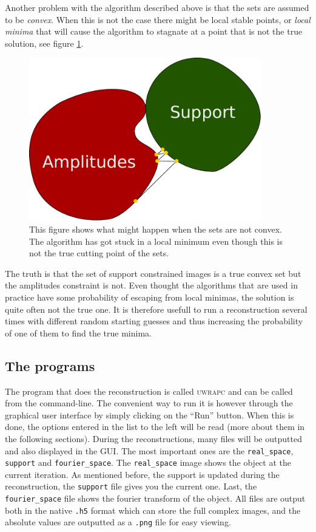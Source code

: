 \documentclass[11pt,a4paper]{article}
\newcommand{\hawk}[1]{\textsc{#1}}
\newcommand{\com}[1]{\texttt{#1}}
\begin{document}
Another problem with the algorithm described above is that the sets are assumed to be \emph{convex}. When this is not the case there might be local stable points, or \emph{local minima} that will cause the algorithm to stagnate at a point that is not the true solution, see figure \ref{fig:twosets_nonconvex}.
\begin{figure}
  \includegraphics[width=0.9\textwidth]{Images/Convex_optimization/twosets_nonconvex.pdf}
  \caption{This figure shows what might happen when the sets are not convex. The algorithm has got stuck in a local minimum even though this is not the true cutting point of the sets.}
  \label{fig:twosets_nonconvex}
\end{figure}

The truth is that the set of support constrained images is a true convex set but the amplitudes constraint is not. Even thought the algorithms that are used in practice have some probability of escaping from local minimas, the solution is quite often not the true one. It is therefore usefull to run a reconstruction several times with different random starting guesses and thus increasing the probability of one of them to find the true minima.

\subsection{The programs}
The program that does the reconstruction is called \hawk{uwrapc} and can be called from the command-line. The convenient way to run it is however through the graphical user interface by simply clicking on the ``Run'' button. When this is done, the options entered in the list to the left will be read (more about them in the following sections). During the reconstructions, many files will be outputted and also displayed in the GUI. The most important ones are the \com{real\_space}, \com{support} and \com{fourier\_space}. The \com{real\_space} image shows the object at the current iteration. As mentioned before, the support is updated during the reconstruction, the \com{support} file gives you the current one. Last, the \com{fourier\_space} file shows the fourier transform of the object. All files are output both in the native \com{.h5} format which can store the full complex images, and the absolute values are outputted as a \com{.png} file for easy viewing.
\end{document}
